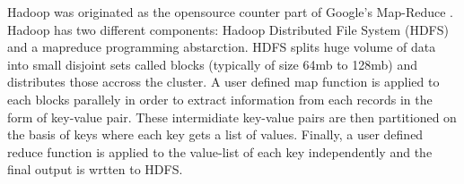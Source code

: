 Hadoop was originated as the opensource counter part of Google's Map-Reduce \cite{fw:mapreduce}.
Hadoop has two different components: Hadoop Distributed File System (HDFS) and a mapreduce programming abstarction.
HDFS splits huge volume of data into small disjoint sets called blocks (typically of size 64mb to 128mb) and distributes those accross the cluster.
A user defined map function is applied to each blocks parallely in order to extract information from each records in the form of key-value pair.
These intermidiate key-value pairs are then partitioned on the basis of keys where each key gets a list of values.
Finally, a user defined reduce function is applied to the value-list of each key independently and the final output is wrtten to HDFS.


